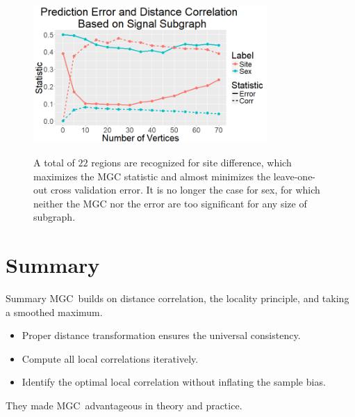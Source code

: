 \documentclass[mathserif,t]{beamer}
\newcommand{\Mgc}{MGC}
\begin{document}
\begin{frame}
\begin{figure}[!ht]
	\centering
	\includegraphics[width=3.5in]{batch_sex_cor_error.png}
	\label{fig:study}
	\caption{A total of $22$ regions are recognized for site difference, which maximizes the MGC statistic and almost minimizes the leave-one-out cross validation error. It is no longer the case for sex, for which neither the MGC nor the error are too significant for any size of subgraph.}
\end{figure}
\end{frame}

\section{Summary}
\begin{frame}{Summary}
\pause
\Mgc~builds on distance correlation, the locality principle, and taking a smoothed maximum.

\pause
\medskip
\begin{itemize}[<+->]
\item Proper distance transformation ensures the universal consistency.
\item Compute all local correlations iteratively.
\item Identify the optimal local correlation without inflating the sample bias.
\end{itemize}
\pause
\medskip
They made \Mgc~advantageous in theory and practice.\\
\end{frame}
\end{document}

